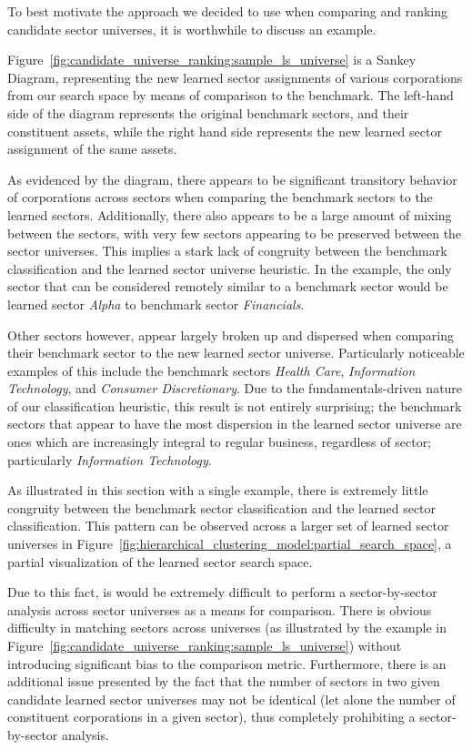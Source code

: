 \documentclass[../main.tex]{subfiles}
\begin{document}
To best motivate the approach we decided to use when comparing and ranking candidate sector universes, it is worthwhile to discuss an example.

Figure~\ref{fig:candidate_universe_ranking:sample_ls_universe} is a Sankey Diagram, representing the new learned sector assignments of various corporations from our search space by means of comparison to the benchmark. The left-hand side of the diagram represents the original benchmark sectors, and their constituent assets, while the right hand side represents the new learned sector assignment of the same assets.

As evidenced by the diagram, there appears to be significant transitory behavior of corporations across sectors when comparing the benchmark sectors to the learned sectors. Additionally, there also appears to be a large amount of mixing between the sectors, with very few sectors appearing to be preserved between the sector universes. This implies a stark lack of congruity between the benchmark classification and the learned sector universe heuristic. In the example, the only sector that can be considered remotely similar to a benchmark sector would be learned sector \textit{Alpha} to benchmark sector \textit{Financials}.

Other sectors however, appear largely broken up and dispersed when comparing their benchmark sector to the new learned sector universe. Particularly noticeable examples of this include the benchmark sectors \textit{Health Care}, \textit{Information Technology}, and \textit{Consumer Discretionary}. Due to the fundamentals-driven nature of our classification heuristic, this result is not entirely surprising; the benchmark sectors that appear to have the most dispersion in the learned sector universe are ones which are increasingly integral to regular business, regardless of sector; particularly \textit{Information Technology}.

As illustrated in this section with a single example, there is extremely little congruity between the benchmark sector classification and the learned sector classification. This pattern can be observed across a larger set of learned sector universes in Figure~\ref{fig:hierarchical_clustering_model:partial_search_space}, a partial visualization of the learned sector search space.

Due to this fact, is would be extremely difficult to perform a sector-by-sector analysis across sector universes as a means for comparison. There is obvious difficulty in matching sectors across universes (as illustrated by the example in Figure~\ref{fig:candidate_universe_ranking:sample_ls_universe}) without introducing significant bias to the comparison metric. Furthermore, there is an additional issue presented by the fact that the number of sectors in two given candidate learned sector universes may not be identical (let alone the number of constituent corporations in a given sector), thus completely prohibiting a sector-by-sector analysis.
\end{document}
